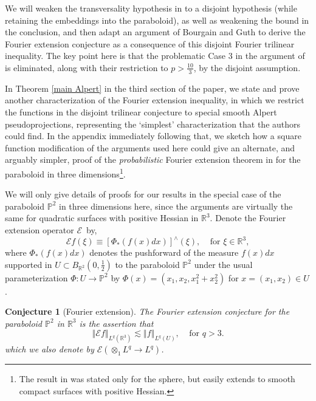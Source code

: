 \documentclass{amsart}%
\theoremstyle{plain}
\newtheorem{conjecture}[theorem]{Conjecture}
\numberwithin{equation}{section}
\begin{document}
We will weaken the transversality hypothesis in \cite{BeCaTa} to a disjoint
hypothesis (while retaining the embeddings into the paraboloid), as well as
weakening the bound in the conclusion, and then adapt an argument of Bourgain
and Guth \cite{BoGu} to derive the Fourier extension conjecture as a
consequence of this disjoint Fourier trilinear inequality. The key point here
is that the problematic Case 3 in the argument of \cite[Section 2]{BoGu} is
eliminated, along with their restriction to $p>\frac{10}{3}$, by the disjoint assumption.

In Theorem \ref{main Alpert} in the third section of the paper, we state and
prove another characterization of the Fourier extension inequality, in which
we restrict the functions in the disjoint trilinear conjecture to special
smooth Alpert pseudoprojections, representing the `simplest' characterization
that the authors could find. In the appendix immediately following that, we
sketch how a square function modification of the arguments used here could
give an alternate, and arguably simpler, proof of the \emph{probabilistic}
Fourier extension theorem in \cite{Saw7} for the paraboloid in three
dimensions\footnote{The result in \cite{Saw7} was stated only for the sphere,
but easily extends to smooth compact surfaces with positive Hessian.}.

We will only give details of proofs for our results in the special case of the
paraboloid $\mathbb{P}^{2}$ in three dimensions here, since the arguments are
virtually the same for quadratic surfaces with positive Hessian in
$\mathbb{R}^{3}$. Denote the Fourier extension operator $\mathcal{E}$\ by,%
\[
\mathcal{E}f\left(  \xi\right)  \equiv\left[  \Phi_{\ast}\left(  f\left(
x\right)  dx\right)  \right]  ^{\wedge}\left(  \xi\right)
,\ \ \ \ \ \text{for }\xi\in\mathbb{R}^{3},
\]
where $\Phi_{\ast}\left(  f\left(  x\right)  dx\right)  $ denotes the
pushforward of the measure $f\left(  x\right)  dx$ supported in $U\subset
B_{\mathbb{R}^{2}}\left(  0,\frac{1}{2}\right)  $ to the paraboloid
$\mathbb{P}^{2}$ under the usual parameterization $\Phi:U\rightarrow
\mathbb{P}^{2}$ by $\Phi\left(  x\right)  =\left(  x_{1},x_{2},x_{1}^{2}%
+x_{2}^{2}\right)  $ for $x=\left(  x_{1},x_{2}\right)  \in U$.

\begin{conjecture}
[Fourier extension]The Fourier extension conjecture for the paraboloid
$\mathbb{P}^{2}$ in $\mathbb{R}^{3}$ is the assertion that%
\begin{equation}
\left\Vert \mathcal{E}f\right\Vert _{L^{q}\left(  \mathbb{R}^{3}\right)
}\lesssim\left\Vert f\right\Vert _{L^{q}\left(  U\right)  }%
,\ \ \ \ \ \text{for }q>3.\label{FEC}%
\end{equation}
which we also denote by $\mathcal{E}\left(  \otimes_{1}L^{q}\rightarrow
L^{q}\right)  $.
\end{conjecture}
\end{document}
